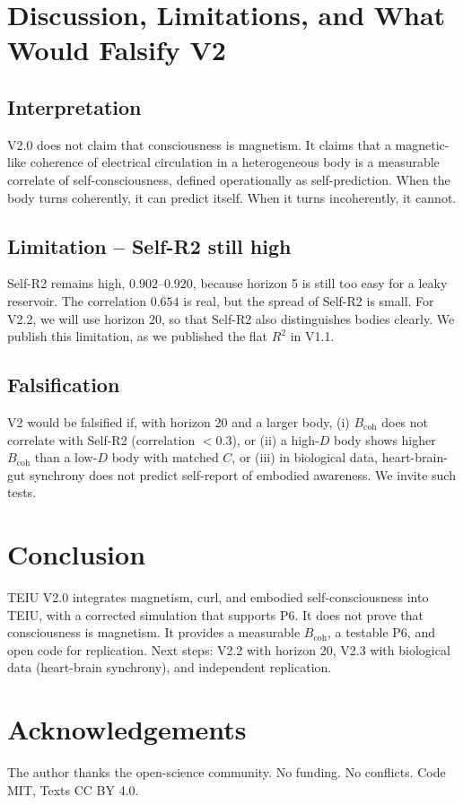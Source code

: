 \documentclass[11pt,a4paper]{article}
\begin{document}
\section{Discussion, Limitations, and What Would Falsify V2}
\subsection{Interpretation}
V2.0 does not claim that consciousness is magnetism. It claims that a magnetic-like coherence of electrical circulation in a heterogeneous body is a measurable correlate of self-consciousness, defined operationally as self-prediction. When the body turns coherently, it can predict itself. When it turns incoherently, it cannot.

\subsection{Limitation -- Self-R2 still high}
Self-R2 remains high, $0.902$--$0.920$, because horizon 5 is still too easy for a leaky reservoir. The correlation $0.654$ is real, but the spread of Self-R2 is small. For V2.2, we will use horizon 20, so that Self-R2 also distinguishes bodies clearly. We publish this limitation, as we published the flat $R^2$ in V1.1.

\subsection{Falsification}
V2 would be falsified if, with horizon 20 and a larger body, (i) $B_{\text{coh}}$ does not correlate with Self-R2 (correlation $< 0.3$), or (ii) a high-$D$ body shows higher $B_{\text{coh}}$ than a low-$D$ body with matched $C$, or (iii) in biological data, heart-brain-gut synchrony does not predict self-report of embodied awareness. We invite such tests.

\section{Conclusion}
TEIU V2.0 integrates magnetism, curl, and embodied self-consciousness into TEIU, with a corrected simulation that supports P6. It does not prove that consciousness is magnetism. It provides a measurable $B_{\text{coh}}$, a testable P6, and open code for replication. Next steps: V2.2 with horizon 20, V2.3 with biological data (heart-brain synchrony), and independent replication.

\section*{Acknowledgements}
The author thanks the open-science community. No funding. No conflicts. Code MIT, Texts CC BY 4.0.
\end{document}
